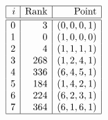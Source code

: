 $$
\begin{array}{|r|r|r|}
\hline
i & \mbox{Rank} & \mbox{Point} \\
\hline
\hline
0 & 3 & ( 0, 0, 0, 1 )\\
1 & 0 & ( 1, 0, 0, 0 )\\
2 & 4 & ( 1, 1, 1, 1 )\\
3 & 268 & ( 1, 2, 4, 1 )\\
4 & 336 & ( 6, 4, 5, 1 )\\
5 & 184 & ( 1, 4, 2, 1 )\\
6 & 224 & ( 6, 2, 3, 1 )\\
7 & 364 & ( 6, 1, 6, 1 )\\
\hline
\end{array}
$$

